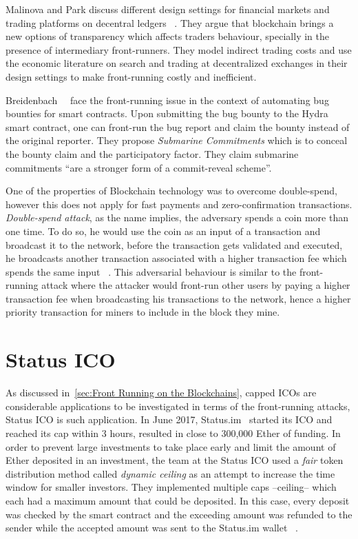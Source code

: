 Malinova and Park discuss different design settings for financial markets and trading platforms on decentral ledgers ~\cite{malinova2017market}.  They argue that blockchain brings a new options of transparency which affects traders behaviour, specially in the presence of intermediary front-runners. They model indirect trading costs and use the economic literature on search and trading at decentralized exchanges in their design settings to make front-running costly and inefficient.


Breidenbach~\etal~\cite{breidenbach2018enter} face the front-running issue in the context of automating bug bounties for smart contracts. Upon submitting the bug bounty to the Hydra smart contract, one can front-run the bug report and claim the bounty instead of the original reporter. They propose \textit{Submarine Commitments} which is to conceal the bounty claim and the participatory factor. They claim submarine commitments ``are a stronger form of a commit-reveal scheme''. 

 
One of the properties of Blockchain technology was to overcome double-spend, however this does not apply for fast payments and zero-confirmation transactions. \textit{Double-spend attack}, as the name implies, the adversary spends a coin more than one time. To do so, he would use the coin as an input of a transaction and broadcast it to the network, before the transaction gets validated and executed, he broadcasts another transaction associated with a higher transaction fee which spends the same input ~\cite{bamert2013have, karame2012double}. This adversarial behaviour is similar to the front-running attack where the attacker would front-run other users by paying a higher transaction fee when broadcasting his transactions to the network, hence a higher priority transaction for miners to include in the block they mine.  



\section{Status ICO} 
As discussed in~\ref{sec:Front Running on the Blockchains}, capped ICOs are considerable applications to be investigated in terms of the front-running attacks, Status ICO is such application. In June 2017, Status.im~\cite{statuswhitepaper} started its ICO and reached its cap within 3 hours, resulted in close to 300,000 Ether of funding. In order to prevent large investments to take place early and limit the amount of Ether deposited in an investment, the team at the Status ICO used a \textit{fair} token distribution method called \textit{dynamic ceiling} as an attempt to increase the time window for smaller investors. They implemented multiple caps --ceiling-- which each had a maximum amount that could be deposited. In this case, every deposit was checked by the smart contract and the exceeding amount was refunded to the sender while the accepted amount was sent to the Status.im wallet ~\cite{statusicoanalysis}. 

